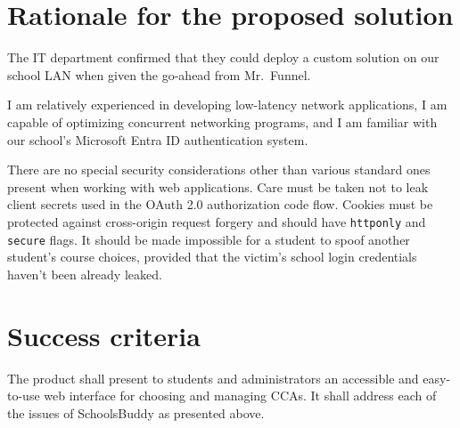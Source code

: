 \section{Rationale for the proposed solution}

The IT department confirmed that they could deploy a custom solution on our
school LAN when given the go-ahead from Mr.~Funnel.

I am relatively experienced in developing low-latency network applications, I
am capable of optimizing concurrent networking programs, and I am familiar with
our school's Microsoft Entra ID authentication system.


There are no special security considerations other than various standard ones
present when working with web applications. Care must be taken not to leak
client secrets used in the OAuth 2.0 authorization code flow. Cookies must be
protected against cross-origin request forgery and should have
\texttt{httponly} and \texttt{secure} flags. It should be made impossible for a
student to spoof another student's course choices, provided that the victim's
school login credentials haven't been already leaked.

\section{Success criteria}

The product shall present to students and administrators an accessible and
easy-to-use web interface for choosing and managing CCAs. It shall address each
of the issues of SchoolsBuddy as presented above.

